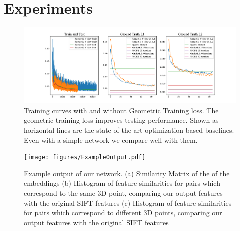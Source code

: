 \documentclass[10pt,twocolumn,letterpaper]{article}
\begin{document}
\section{Experiments}

\begin{figure}
\begin{center}
  \includegraphics[width=0.8\linewidth]{figures/TrainingCurves.pdf}
  \end{center}
    \caption{
      Training curves with and without Geometric Training loss.
      The geometric training loss improves testing performance.
      Shown as horizontal lines are the state of the art optimization based baselines.
      Even with a simple network we compare well with them.
    }
  \label{fig:short}
\end{figure}


\begin{figure}
\begin{center}
  \texttt{[image: figures/ExampleOutput.pdf]}
  \end{center}
     \caption{Example output of our network. (a) Similarity Matrix of the of the embeddings (b) Histogram of feature similarities for pairs which correspond to the same 3D point, comparing our output features with the original SIFT features (c) Histogram of feature similarities for pairs which correspond to different 3D points, comparing our output features with the original SIFT features}
  \label{fig:short}
\end{figure}
\end{document}

